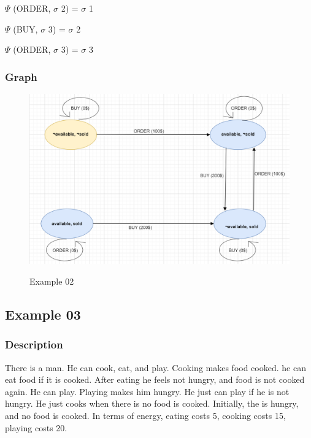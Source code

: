 \documentclass[11pt]{article}
\begin{document}
 \(  \Psi  \)  (ORDER, $ \sigma $ 2) = $ \sigma $ 1\par

 \(  \Psi  \)  (BUY, $ \sigma $ 3) = $ \sigma $ 2\par

 \(  \Psi  \)  (ORDER, $ \sigma $ 3) = $ \sigma $ 3\par
\subsubsection{Graph}\label{par:p402}
\begin{figure}[H]
\includegraphics[width=1\linewidth, height=0.3\textheight]{./media/image1.png}
\label{Figure:f02}
\caption{Example 02}
\end{figure}
\subsection{Example 03}
	\subsubsection{Description}\label{par:p103}
	There is a man. He can cook, eat, and play. Cooking makes food cooked. he can eat food if it is cooked. After eating he feels not hungry, and food is not cooked again. He can play. Playing makes him hungry. He just can play if he is not hungry. He just cooks when there is no food is cooked. Initially, the is hungry, and no food is cooked. In terms of energy, eating costs 5, cooking costs 15, playing costs 20.\\
	\\
\end{document}
